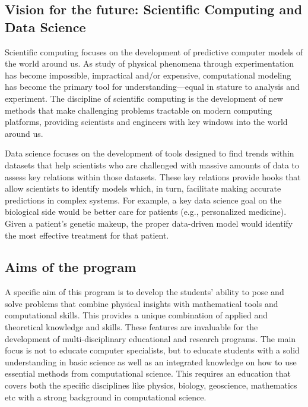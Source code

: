 \documentclass[%
oneside,                 %
final,                   %
10pt]{article}
\begin{document}
\vspace{6mm}

\subsection*{Vision for the future: Scientific Computing and Data Science}

Scientific computing focuses on the development of predictive computer
models of the world around us. As study of physical phenomena through
experimentation has become impossible, impractical and/or expensive,
computational modeling has become the primary tool for
understanding—equal in stature to analysis and experiment. 
The discipline of scientific computing
is the development of new methods that make challenging problems
tractable on modern computing platforms, providing scientists and
engineers with key windows into the world around us.

Data science focuses on the development of tools designed to find
trends within datasets that help scientists who are challenged with
massive amounts of data to assess key relations within those
datasets. These key relations provide hooks that allow scientists to
identify models which, in turn, facilitate making accurate predictions
in complex systems. For example, a key data science goal on the
biological side would be better care for patients (e.g., personalized
medicine). Given a patient’s genetic makeup, the proper data-driven
model would identify the most effective treatment for that patient.

\subsection*{Aims of the program}

A specific aim of this program is to develop the students' ability to pose and
solve problems that combine physical insights with mathematical tools
and computational skills. This provides a unique combination
of applied and theoretical knowledge and skills. These features are invaluable
for the development of multi-disciplinary educational and research programs.
The main focus is not to educate computer
specialists, but to educate students with a solid understanding in basic science
as well as an integrated knowledge on how  to use
essential methods from computational science. This requires an
education that covers both the specific disciplines like physics, biology,
geoscience, mathematics etc with a strong background in computational science.
\end{document}

